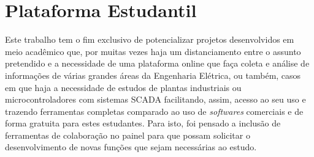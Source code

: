\section{Plataforma Estudantil}
\label{sec:plataforma-estudantil}

    Este trabalho tem o fim exclusivo de potencializar projetos desenvolvidos em meio acadêmico que, por muitas vezes haja um distanciamento entre o assunto pretendido e a necessidade de uma plataforma online que faça coleta e análise de informações de várias grandes áreas da Engenharia Elétrica, ou também, casos em que haja a necessidade de estudos de plantas industriais ou microcontroladores com sistemas \gls{SCADA} facilitando, assim, acesso ao seu uso e trazendo ferramentas completas comparado ao uso de \textit{softwares} comerciais e de forma gratuita para estes estudantes. Para isto, foi pensado a inclusão de ferramentas de colaboração no painel para que possam solicitar o desenvolvimento de novas funções que sejam necessárias ao estudo.